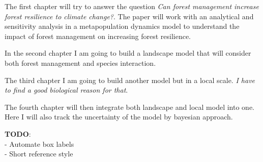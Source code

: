 The first chapter will try to answer the question \textit{Can forest management increase forest resilience to climate change?}. The paper will work with an analytical and sensitivity analysis in a metapopulation dynamics model to understand the impact of forest management on increasing forest resilience.

In the second chapter I am going to build a landscape model that will consider both forest management and species interaction.

The third chapter I am going to build another model but in a local scale. \textit{I have to find a good biological reason for that}.

The fourth chapter will then integrate both landscape and local model into one. Here I will also track the uncertainty of the model by bayesian approach.

\textbf{TODO}: \\
- Automate box labels \\
- Short reference style \\




